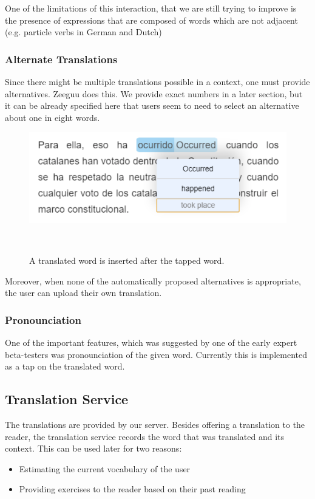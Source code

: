 One of the limitations of this interaction, that we are still trying to improve is the presence of expressions that are composed of words which are not adjacent (e.g. particle verbs in German and Dutch)


\subsubsection{Alternate Translations}
Since there might be multiple translations possible in a context, one must provide alternatives. Zeeguu does this. We provide exact numbers in a later section, but it can be already specified here that users seem to need to select an alternative about one in eight words.

\begin{figure}[h!]
\centering
  \includegraphics[width=0.8\columnwidth]{figures/translation_alter_menu}
  \caption{A translated word is inserted after the tapped word.}~\label{fig:registrations}
\end{figure}

Moreover, when none of the automatically proposed alternatives is appropriate, the user can upload their own translation.


\subsubsection{Pronounciation}
One of the important features, which was suggested by one of the early expert beta-testers was pronounciation of the given word. Currently this is implemented as a tap on the translated word.


\subsection {Translation Service}

The translations are provided by our server. Besides offering a translation to the reader, the translation service records the word that was translated and its context. This can be used later for two reasons: 

\begin{itemize}
	\item Estimating the current vocabulary of the user
	\item Providing exercises to the reader based on their past reading
\end{itemize}

